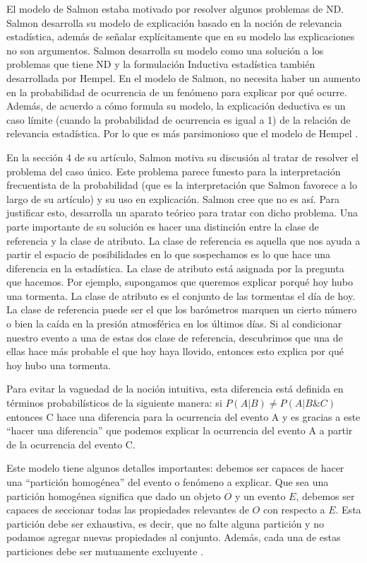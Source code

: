 El modelo de Salmon estaba motivado por resolver algunos problemas de ND. Salmon desarrolla su modelo de explicación basado en la noción de relevancia estadística, además de señalar explícitamente que en su modelo las explicaciones no son argumentos. Salmon desarrolla su modelo como una solución a los problemas que tiene ND y la formulación Inductiva estadística también desarrollada por Hempel. En el modelo de Salmon, no necesita haber un aumento en la probabilidad de ocurrencia de un fenómeno para explicar por qué ocurre. Además, de acuerdo a cómo formula su modelo, la explicación deductiva es un caso límite (cuando la probabilidad de ocurrencia es igual a 1) de la relación de relevancia estadística. Por lo que es más parsimonioso que el modelo de Hempel \cite{Salmon1970}.

En la sección 4 de su artículo, Salmon motiva su discusión al tratar de resolver el problema del caso único. Este problema parece funesto para la interpretación frecuentista de la probabilidad (que es la interpretación que Salmon favorece a lo largo de su artículo) y su uso en explicación. Salmon cree que no es así. Para justificar esto, desarrolla un aparato teórico para tratar con dicho problema. Una parte importante de su solución es hacer una distinción entre la clase de referencia y la clase de atributo. La clase de referencia es aquella que nos ayuda a partir el espacio de posibilidades en lo que sospechamos es lo que hace una diferencia en la estadística. La clase de atributo está asignada por la pregunta que hacemos. Por ejemplo, supongamos que queremos explicar porqué hoy hubo una tormenta. La clase de atributo es el conjunto de las tormentas el día de hoy. La clase de referencia puede ser el que los barómetros marquen un cierto número o bien la caída en la presión atmosférica en los últimos días. Si al condicionar nuestro evento a una de estas dos clase de referencia, descubrimos que una de ellas hace más probable el que hoy haya llovido, entonces esto explica por qué hoy hubo una tormenta.

Para evitar la vaguedad de la noción intuitiva, esta diferencia está definida en términos probabilísticos de la siguiente manera: si $P(A|B) \neq P(A|B\&C)$ entonces C hace una diferencia para la ocurrencia del evento A y es gracias a este ``hacer una diferencia'' que podemos explicar la ocurrencia del evento A a partir de la ocurrencia del evento C.

Este modelo tiene algunos detalles importantes: debemos ser capaces de hacer una ``partición homogénea'' del evento o fenómeno a explicar. Que sea una partición homogénea significa que dado un objeto $O$ y un evento $E$, debemos ser capaces de seccionar todas las propiedades relevantes de $O$ con respecto a $E$. Esta partición debe ser exhaustiva, es decir, que no falte alguna partición y no podamos agregar nuevas propiedades al conjunto. Además, cada una de estas particiones debe ser mutuamente excluyente \cite{Woodward2019}.

